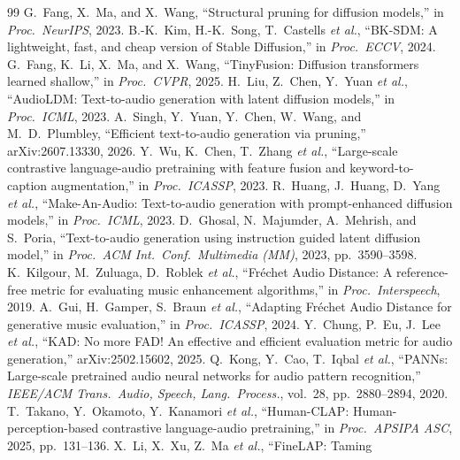 \clearpage
{\setlength{\itemsep}{0pt}\setlength{\parsep}{0pt}
\begin{thebibliography}{99}
 G.~Fang, X.~Ma, and X.~Wang, ``Structural pruning for diffusion
models,'' in \emph{Proc.\ NeurIPS}, 2023.
 B.-K.~Kim, H.-K.~Song, T.~Castells \emph{et al.}, ``BK-SDM: A lightweight, fast,
and cheap version of Stable Diffusion,'' in \emph{Proc.\ ECCV}, 2024.
 G.~Fang, K.~Li, X.~Ma, and X.~Wang, ``TinyFusion: Diffusion transformers
learned shallow,'' in \emph{Proc.\ CVPR}, 2025.
 H.~Liu, Z.~Chen, Y.~Yuan \emph{et al.}, ``AudioLDM: Text-to-audio generation with latent diffusion models,'' in
\emph{Proc.\ ICML}, 2023.
 A.~Singh, Y.~Yuan, Y.~Chen, W.~Wang, and M.~D.~Plumbley, ``Efficient
text-to-audio generation via pruning,'' arXiv:2607.13330, 2026.
 Y.~Wu, K.~Chen, T.~Zhang \emph{et al.},
``Large-scale contrastive language-audio pretraining with feature fusion and keyword-to-caption
augmentation,'' in \emph{Proc.\ ICASSP}, 2023.
 R.~Huang, J.~Huang, D.~Yang \emph{et al.}, ``Make-An-Audio:
Text-to-audio generation with prompt-enhanced diffusion models,'' in \emph{Proc.\ ICML}, 2023.
 D.~Ghosal, N.~Majumder, A.~Mehrish, and S.~Poria, ``Text-to-audio generation
using instruction guided latent diffusion model,'' in \emph{Proc.\ ACM Int.\ Conf.\ Multimedia (MM)},
2023, pp.~3590--3598.
 K.~Kilgour, M.~Zuluaga, D.~Roblek \emph{et al.}, ``Fr\'echet Audio
Distance: A reference-free metric for evaluating music enhancement algorithms,'' in
\emph{Proc.\ Interspeech}, 2019.
 A.~Gui, H.~Gamper, S.~Braun \emph{et al.}, ``Adapting Fr\'echet Audio
Distance for generative music evaluation,'' in \emph{Proc.\ ICASSP}, 2024.
 Y.~Chung, P.~Eu, J.~Lee \emph{et al.}, ``KAD: No more FAD!
An effective and efficient evaluation metric for audio generation,'' arXiv:2502.15602, 2025.
 Q.~Kong, Y.~Cao, T.~Iqbal \emph{et al.}, ``PANNs:
Large-scale pretrained audio neural networks for audio pattern recognition,'' \emph{IEEE/ACM
Trans.\ Audio, Speech, Lang.\ Process.}, vol.~28, pp.~2880--2894, 2020.
 T.~Takano, Y.~Okamoto, Y.~Kanamori \emph{et al.}, ``Human-CLAP:
Human-perception-based contrastive language-audio pretraining,'' in \emph{Proc.\ APSIPA ASC}, 2025,
pp.~131--136.
 X.~Li, X.~Xu, Z.~Ma \emph{et al.}, ``FineLAP: Taming

\end{thebibliography}}
